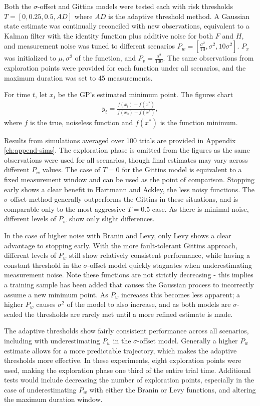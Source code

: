 Both the $\sigma$-offset and Gittins models were tested each with risk thresholds $T=[0, 0.25, 0.5, AD]$ where $AD$ is the adaptive threshold method. A Gaussian state estimate was continually reconciled with new observations, equivalent to a Kalman filter with the identity function plus additive noise for both $F$ and $H$, and measurement noise was tuned to different scenarios $P_w=[\frac{\sigma^2}{10}, \sigma^2, 10\sigma^2]$. $P_x$ was initialized to $\mu, \sigma^2$ of the function, and $P_v=\frac{\sigma^2}{100}$. The same observations from exploration points were provided for each function under all scenarios, and the maximum duration was set to 45 measurements.

For time $t$, let $x_t$ be the GP's estimated minimum point. The figures chart
\begin{align}
  y_t = \frac{f(x_t) - f(x^*)}{f(x_0) - f(x^*)},
\end{align}
where $f$ is the true, noiseless function and $f(x^*)$ is the function minimum.

Results from simulations averaged over 100 trials are provided in Appendix \ref{ch:append-sims}. The exploration phase is omitted from the figures as the same observations were used for all scenarios, though final estimates may vary across different $P_w$ values. The case of $T=0$ for the Gittins model is equivalent to a fixed measurement window and can be used as the point of comparison. Stopping early shows a clear benefit in Hartmann and Ackley, the less noisy functions. The $\sigma$-offset method generally outperforms the Gittins in these situations, and is comparable only to the most aggressive $T=0.5$ case. As there is minimal noise, different levels of $P_w$ show only slight differences. 

In the case of higher noise with Branin and Levy, only Levy shows a clear advantage to stopping early. With the more fault-tolerant Gittins approach, different levels of $P_w$ still show relatively consistent performance, while having a constant threshold in the $\sigma$-offset model quickly stagnates when underestimating measurement noise. Note these functions are not strictly decreasing - this implies a training sample has been added that causes the Gaussian process to incorrectly assume a new minimum point. As $P_w$ increases this becomes less apparent; a higher $P_w$ causes $\sigma^2$ of the model to also increase, and as both models are $\sigma$-scaled the thresholds are rarely met until a more refined estimate is made. 

The adaptive thresholds show fairly consistent performance across all scenarios, including with underestimating $P_w$ in the $\sigma$-offset model. Generally a higher $P_w$ estimate allows for a more predictable trajectory, which makes the adaptive thresholds more effective. In these experiments, eight exploration points were used, making the exploration phase one third of the entire trial time. Additional tests would include decreasing the number of exploration points, especially in the case of underestimating $P_w$ with either the Branin or Levy functions, and altering the maximum duration window.

